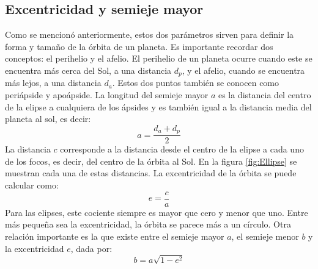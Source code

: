 \documentclass[a4paper,10pt]{article}
\begin{document}
\subsection{Excentricidad y semieje mayor}
Como se mencionó anteriormente, estos dos parámetros sirven para definir la forma y tamaño de la órbita de un planeta. Es importante recordar dos conceptos: el perihelio y el afelio. El perihelio de un planeta ocurre cuando este se encuentra más cerca del Sol, a una distancia $d_p$, y el afelio, cuando se encuentra más lejos, a una distancia $d_a$. Estos dos puntos también se conocen como periápside y apoápside. La longitud del semieje mayor $a$ es la distancia del centro de la elipse a cualquiera de los ápsides y es también igual a la distancia media del planeta al sol, es decir:
\[a = \frac{d_a + d_p}{2}\]
La distancia $c$ corresponde a la distancia desde el centro de la elipse a cada uno de los focos, es decir, del centro de la órbita al Sol. En la figura \ref{fig:Ellipse} se muestran cada una de estas distancias. La excentricidad de la órbita se puede calcular como:
\begin{equation}
  e = \frac{c}{a}
  \label{eq:Eccentricity}
\end{equation}
Para las elipses, este cociente siempre es mayor que cero y menor que uno. Entre más pequeña sea la excentricidad, la órbita se parece más a un círculo. Otra relación importante es la que existe entre el semieje mayor $a$, el semieje menor $b$ y la excentricidad $e$, dada por:
\begin{equation}
  b = a\sqrt{1 - e^2}
  \label{eq:Semiaxis}
\end{equation}
\end{document}
